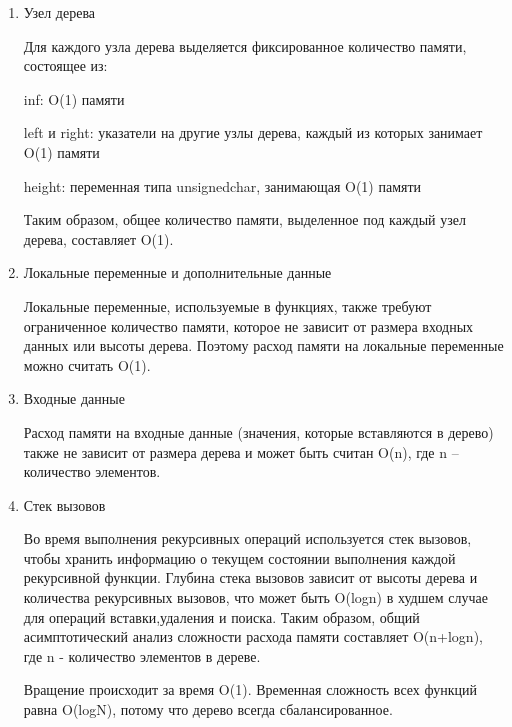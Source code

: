 \documentclass[bachelor, och, referat, times]{SCWorks}
\begin{document}
  \begin{enumerate}
    
\item Узел дерева

Для каждого узла дерева выделяется фиксированное количество памяти, состоящее из:

inf: O(1) памяти

left и right: указатели на другие узлы дерева, каждый из которых занимает O(1) памяти

height: переменная типа unsignedchar, занимающая O(1) памяти

Таким образом, общее количество памяти, выделенное под каждый узел дерева, составляет O(1).


\item Локальные переменные и дополнительные данные

Локальные переменные, используемые в функциях, 
также требуют ограниченное количество памяти, 
которое не зависит от размера входных данных или высоты дерева.
Поэтому расход памяти на локальные переменные можно считать O(1).


\item Входные данные

Расход памяти на входные данные (значения, которые вставляются в дерево) 
также не зависит от размера дерева и может быть считан O(n), где n – количество элементов.


\item Стек вызовов


Во время выполнения рекурсивных операций используется стек вызовов, 
чтобы хранить информацию о текущем состоянии выполнения каждой рекурсивной функции. 
Глубина стека вызовов зависит от высоты дерева и количества рекурсивных вызовов, что может быть O(logn) в худшем случае для операций вставки,удаления и поиска.
Таким образом, общий асимптотический анализ сложности расхода памяти составляет O(n+logn),
 где n - количество элементов в дереве.

Вращение происходит за время O(1). 
Временная сложность всех функций равна O(logN), 
потому что дерево всегда сбалансированное.

  \end{enumerate}

 


    \appendix
     
\end{document}
